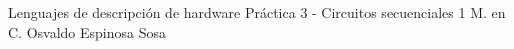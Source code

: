 




	\pnormal
	{Lenguajes de descripción de hardware}
	{Práctica 3  - Circuitos secuenciales 1}
	{M. en C. Osvaldo Espinosa Sosa}
	\tableofcontents
	
	\newpage   
	\clearpage 



